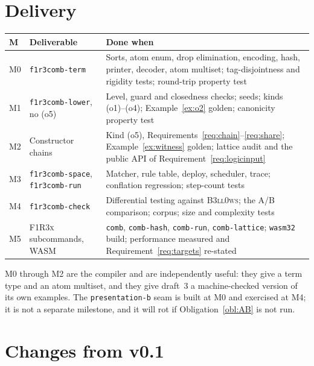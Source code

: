 \documentclass[11pt,a4paper]{article}
\newcommand{\code}[1]{\texttt{#1}}
\newcommand{\Bell}{\textsc{B3ll0ws}}
\newcommand{\Fx}{\textsc{F1R3x}}
\theoremstyle{definition}
\theoremstyle{plain}
\begin{document}
\section{Delivery}

\begin{center}
\begin{tabularx}{\linewidth}{@{}ll>{\raggedright\arraybackslash}X@{}}
\toprule
M & Deliverable & Done when\\
\midrule
M0 & \code{f1r3comb-term} & Sorts, atom enum, drop elimination, encoding,
hash, printer, decoder, atom multiset; tag-disjointness and rigidity tests;
round-trip property test\\
M1 & \code{f1r3comb-lower}, no (o5) & Level, guard and closedness checks;
seeds; kinds (o1)--(o4); Example~\ref{ex:o2} golden; canonicity property test\\
M2 & Constructor chains & Kind (o5),
Requirements~\ref{req:chain}--\ref{req:share}; Example~\ref{ex:witness}
golden; lattice audit and the public API of
Requirement~\ref{req:logicinput}\\
M3 & \code{f1r3comb-space}, \code{f1r3comb-run} & Matcher, rule table, deploy,
scheduler, trace; conflation regression; step-count tests\\
M4 & \code{f1r3comb-check} & Differential testing against \Bell; the A/B
comparison; corpus; size and complexity tests\\
M5 & \Fx{} subcommands, WASM & \code{comb}, \code{comb-hash}, \code{comb-run},
\code{comb-lattice}; \code{wasm32} build; performance measured and
Requirement~\ref{req:targets} re-stated\\
\bottomrule
\end{tabularx}
\end{center}

\noindent
M0 through M2 are the compiler and are independently useful: they give
\cite{logic} a term type and an atom multiset, and they give draft~3 a
machine-checked version of its own examples. The \code{presentation-b} seam is
built at M0 and exercised at M4; it is not a separate milestone, and it will
rot if Obligation~\ref{obl:AB} is not run.

\section{Changes from v0.1}\label{sec:v1delta}
\end{document}
